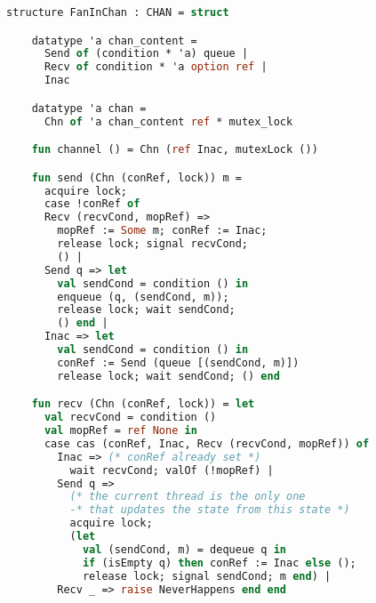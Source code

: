 \documentclass{article}
\begin{document}
  \begin{lstlisting}[language=ML, style=codestyle1]
    structure FanInChan : CHAN = struct

    datatype 'a chan_content =
      Send of (condition * 'a) queue |
      Recv of condition * 'a option ref |
      Inac

    datatype 'a chan =
      Chn of 'a chan_content ref * mutex_lock

    fun channel () = Chn (ref Inac, mutexLock ())

    fun send (Chn (conRef, lock)) m = 
      acquire lock;
      case !conRef of
      Recv (recvCond, mopRef) => 
        mopRef := Some m; conRef := Inac;
        release lock; signal recvCond;
        () |
      Send q => let
        val sendCond = condition () in
        enqueue (q, (sendCond, m));
        release lock; wait sendCond;
        () end |
      Inac => let
        val sendCond = condition () in
        conRef := Send (queue [(sendCond, m)])
        release lock; wait sendCond; () end 

    fun recv (Chn (conRef, lock)) = let
      val recvCond = condition () 
      val mopRef = ref None in
      case cas (conRef, Inac, Recv (recvCond, mopRef)) of
        Inac => (* conRef already set *)
          wait recvCond; valOf (!mopRef) |
        Send q =>
          (* the current thread is the only one
          -* that updates the state from this state *)
          acquire lock;
          (let
            val (sendCond, m) = dequeue q in
            if (isEmpty q) then conRef := Inac else (); 
            release lock; signal sendCond; m end) |
        Recv _ => raise NeverHappens end end

    \end{lstlisting}
\end{document}
